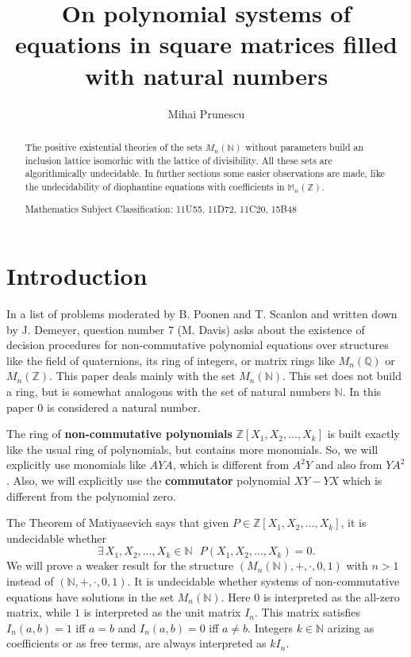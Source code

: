 \documentclass{article}
\title{On polynomial systems of equations in square matrices filled with natural numbers}
\author{Mihai Prunescu}
\date{}
\theoremstyle{plain}
\theoremstyle{definition}
\begin{document}
\maketitle

\begin{abstract}
The positive existential theories of the sets $M_n(\mathbb N)$ without parameters build an inclusion lattice isomorhic with the lattice of divisibility. All these sets are algorithmically undecidable. In further sections some easier observations are made, like the undecidability of diophantine equations with coefficients in $\mathbb M_n(\mathbb Z)$.

Mathematics Subject Classification:  11U55, 11D72, 11C20, 15B48
\end{abstract}

\section{Introduction}\label{sect:introduction} 

In a list of problems moderated by B. Poonen and T. Scanlon and written down by J. Demeyer, question number 7 (M. Davis) \cite{Demeyer} asks about the existence of decision procedures for non-commutative polynomial equations over structures like the field of quaternions, its ring of integers, or matrix rings like $M_n(\mathbb Q)$ or $M_n(\mathbb Z)$. This paper deals mainly with the set $M_n(\mathbb N)$. This set does not build a ring, but is somewhat analogous with the set of natural numbers $\mathbb N$. In this paper $0$ is considered a natural number. 

The ring of {\bf non-commutative polynomials} $\mathbb Z[X_1,X_2, \dots, X_k]$ is built exactly like the usual ring of polynomials, but contains more monomials. So, we will explicitly use monomials like $AYA$, which is different from $A^2Y$ and also from $YA^2$. Also, we will explicitly use the {\bf commutator} polynomial $XY-YX$ which is different from the polynomial zero.  

The Theorem of Matiyasevich \cite{Matiyasevich} says that given $P \in \mathbb Z[X_1,X_2, \dots, X_k]$, it is undecidable whether 
$$\exists \, X_1, X_2, \dots, X_k \in \mathbb N\,\,\,\,P(X_1,X_2, \dots, X_k)=0.$$
We will prove a weaker result for the structure $(M_n(\mathbb N), +, \cdot, 0, 1)$ with $n > 1$ instead of $(\mathbb N, +, \cdot, 0, 1)$. It is undecidable whether systems of non-commutative equations have solutions in the set $M_n(\mathbb N)$. Here $0$ is interpreted as the all-zero matrix, while $1$ is interpreted as the unit matrix $I_n$. This matrix satisfies $I_n(a,b) = 1$ iff $a=b$ and $I_n(a,b) = 0$ iff $a \neq b$. Integers $k \in \mathbb N$ arizing as coefficients or as free terms, are always interpreted as $kI_n$. 
\end{document}
